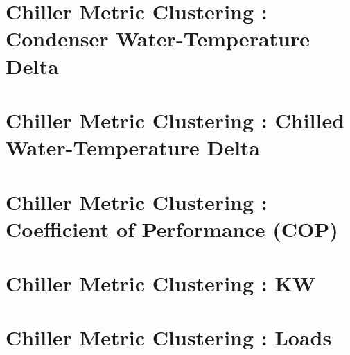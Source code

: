 \documentclass{report}
\begin{document}
\chapter{Chiller Metric Clustering : Condenser Water-Temperature Delta}

\chapter{Chiller Metric Clustering : Chilled Water-Temperature Delta}

\chapter{Chiller Metric Clustering : Coefficient of Performance (COP)}

\chapter{Chiller Metric Clustering : KW}

\chapter{Chiller Metric Clustering : Loads}





\end{document}
